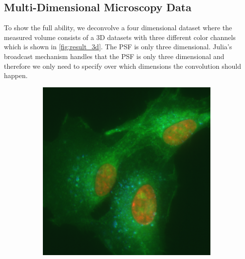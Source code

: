 \documentclass{juliacon}
\begin{document}
    \subsection{Multi-Dimensional Microscopy Data}
        To show the full ability, we deconvolve a four dimensional dataset where the measured volume consists of a 3D datasets
        with three different color channels which is shown in \autoref{fig:result_3d}.
        The PSF is only three dimensional.
        Julia's broadcast mechanism handles that the PSF is only three dimensional and therefore
        we only need to specify over which dimensions the convolution should happen.
        \begin{figure}[h]
            \begin{subfigure}{.25\textwidth}
                \centering
                \includegraphics[width = .95\textwidth]{figures/raw_rgb.png}
            \end{subfigure}%
            \begin{subfigure}{.25\textwidth}
                \centering

\end{subfigure}
\end{figure}
\end{document}
